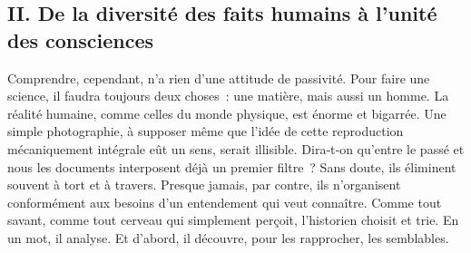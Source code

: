 \documentclass[french,twoside]{book} %
\newcommand{\astermono}{\medskip\centerline{\color{rubric}\large\selectfont{\syms ✻}}\medskip\par}%
\begin{document}
\subsection[{II. De la diversité des faits humains à l’unité des consciences}]{II. De la diversité des faits humains à l’unité des consciences}
\noindent Comprendre, cependant, n’a rien d’une attitude de passivité. Pour faire une science, il faudra toujours deux choses : une matière, mais aussi un homme. La réalité humaine, comme celles du monde physique, est énorme et bigarrée. Une simple photographie, à supposer même que l’idée de cette reproduction mécaniquement intégrale eût un sens, serait illisible. Dira‑t‑on qu’entre le passé et nous les documents interposent déjà un premier filtre ? Sans doute, ils éliminent souvent à tort et à travers. Presque jamais, par contre, ils n’organisent conformément aux besoins d’un entendement qui veut connaître. Comme tout savant, comme tout cerveau qui simplement perçoit, l’historien choisit et trie. En un mot, il analyse. Et d’abord, il découvre, pour les rapprocher, les semblables.\par

\astermono
\end{document}
